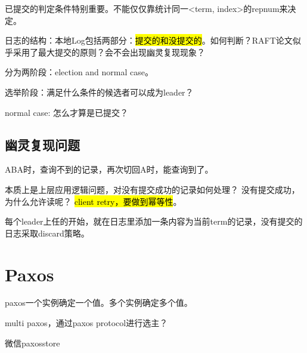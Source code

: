 已提交的判定条件特别重要。不能仅仅靠统计同一<term, index>的repnum来决定。

日志的结构：本地Log包括两部分：\hl{提交的和没提交的}。如何判断？RAFT论文似乎采用了最大提交的原则？会不会出现幽灵复现现象？

分为两阶段：election and normal case。
\begin{enumbox}
\item 选举阶段：满足什么条件的候选者可以成为leader？
\item normal case: 怎么才算是已提交？
\end{enumbox}

\subsection{幽灵复现问题}

ABA时，查询不到的记录，再次切回A时，能查询到了。

本质上是上层应用逻辑问题，对没有提交成功的记录如何处理？
没有提交成功，为什么允许读呢？ \hl{client retry，要做到幂等性}。

每个leader上任的开始，就在日志里添加一条内容为当前term的记录，没有提交的日志采取discard策略。

\section{Paxos}

paxos一个实例确定一个值。多个实例确定多个值。

multi paxos，通过paxos protocol进行选主？

微信paxosstore
